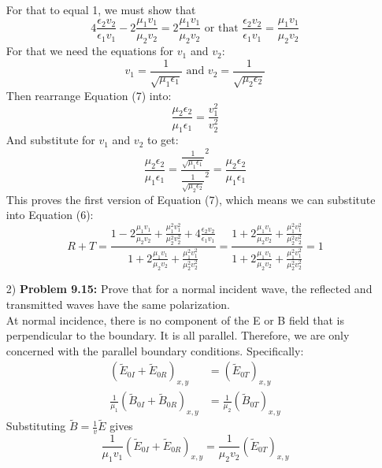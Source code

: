 \documentclass{report}
\begin{document}
\begin{itemize}
\begin{equation}
\end{equation}
For that to equal 1, we must show that
\begin{equation}
  4\frac{\epsilon_2v_2}{\epsilon_1v_1}-2\frac{\mu_1v_1}{\mu_2v_2}=2\frac{\mu_1v_1}{\mu_2v_2} \text{ or that } \frac{\epsilon_2v_2}{\epsilon_1v_1}=\frac{\mu_1v_1}{\mu_2v_2}
\end{equation}
For that we need the equations for $v_1$ and $v_2$:
\begin{equation}
  v_1 = \frac{1}{\sqrt{\mu_1\epsilon_1}} \text{ and } v_2 = \frac{1}{\sqrt{\mu_2\epsilon_2}}
\end{equation}
Then rearrange Equation (7) into:
\begin{equation}
  \frac{\mu_2\epsilon_2}{\mu_1\epsilon_1} = \frac{v_1^2}{v_2^2}
\end{equation}
And substitute for $v_1$ and $v_2$ to get:
\begin{equation}
  \frac{\mu_2\epsilon_2}{\mu_1\epsilon_1} = \frac{\frac{1}{\sqrt{\mu_1\epsilon_1}}^2}{\frac{1}{\sqrt{\mu_2\epsilon_2}}^2} = \frac{\mu_2\epsilon_2}{\mu_1\epsilon_1}
\end{equation}
This proves the first version of Equation (7), which means we can substitute into Equation (6):
\begin{equation}
  R+T=\frac{1-2\frac{\mu_1v_1}{\mu_2v_2}+\frac{\mu_1^2v_1^2}{\mu_2^2v_2^2}+4\frac{\epsilon_2v_2}{\epsilon_1v_1}}{1+2\frac{\mu_1v_1}{\mu_2v_2}+\frac{\mu_1^2v_1^2}{\mu_2^2v_2^2}} = \frac{1+2\frac{\mu_1v_1}{\mu_2v_2}+\frac{\mu_1^2v_1^2}{\mu_2^2v_2^2}}{1+2\frac{\mu_1v_1}{\mu_2v_2}+\frac{\mu_1^2v_1^2}{\mu_2^2v_2^2}} = 1
\end{equation}
\item[2)] \textbf{Problem 9.15:} Prove that for a normal incident wave, the reflected and transmitted waves have the same polarization.\\ \newline
At normal incidence, there is no component of the E or B field that is perpendicular to the boundary.
It is all parallel. Therefore, we are only concerned with the parallel boundary conditions. Specifically:
\begin{align}
(\tilde{E}_{0I}+\tilde{E}_{0R})_{x,y} & = (\tilde{E}_{0T})_{x,y}\\
\frac{1}{\mu_1}(\tilde{B}_{0I}+\tilde{B}_{0R})_{x,y} & = \frac{1}{\mu_2}(\tilde{B}_{0T})_{x,y}
\end{align}
Substituting $\tilde{B}=\frac{1}{v}\tilde{E}$ gives
\begin{equation}
  \frac{1}{\mu_1v_1}(\tilde{E}_{0I}+\tilde{E}_{0R})_{x,y}  = \frac{1}{\mu_2v_2}(\tilde{E}_{0T})_{x,y}

\end{equation}
\end{itemize}
\end{document}
